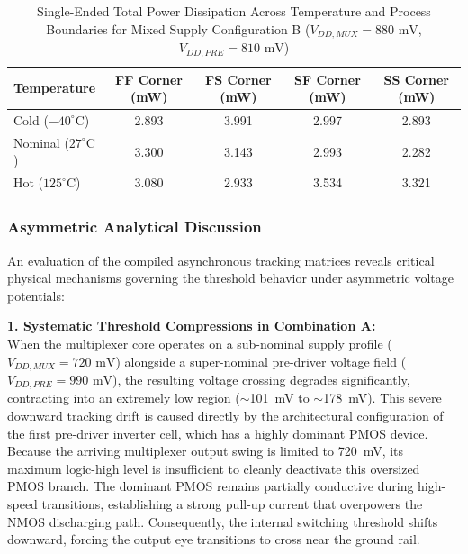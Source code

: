 \begin{table}[H]
    \centering
    \renewcommand{\arraystretch}{1.3}
    \setlength{\tabcolsep}{10pt}
    \small
    \begin{tabular}{|l|c|c|c|c|}
        \hline
        \textbf{Temperature} & \textbf{FF Corner (mW)} & \textbf{FS Corner (mW)} & \textbf{SF Corner (mW)} & \textbf{SS Corner (mW)} \\ \hline
        Cold ($-40^\circ\text{C}$) & 2.893 & 3.991 & 2.997 & 2.893 \\ \hline
        Nominal ($27^\circ\text{C}$) & 3.300 & 3.143 & 2.993 & 2.282 \\ \hline
        Hot ($125^\circ\text{C}$) & 3.080 & 2.933 & 3.534 & 3.321 \\ \hline
    \end{tabular}
    \vspace{2mm}
    \caption{Single-Ended Total Power Dissipation Across Temperature and Process Boundaries for Mixed Supply Configuration B ($V_{DD,MUX} = 880\text{ mV}$, $V_{DD,PRE} = 810\text{ mV}$)}
    \label{tab:asym_b_power_summary}
\end{table}

\clearpage

\subsubsection*{Asymmetric Analytical Discussion}

An evaluation of the compiled asynchronous tracking matrices reveals critical physical mechanisms governing the threshold behavior under asymmetric voltage potentials:

\textbf{1. Systematic Threshold Compressions in Combination A:} \\
When the multiplexer core operates on a sub-nominal supply profile ($V_{DD,MUX} = 720\text{ mV}$) alongside a super-nominal pre-driver voltage field ($V_{DD,PRE} = 990\text{ mV}$), the resulting voltage crossing degrades significantly, contracting into an extremely low region ($\sim$101~mV to $\sim$178~mV). This severe downward tracking drift is caused directly by the architectural configuration of the first pre-driver inverter cell, which has a highly dominant PMOS device. Because the arriving multiplexer output swing is limited to 720~mV, its maximum logic-high level is insufficient to cleanly deactivate this oversized PMOS branch. The dominant PMOS remains partially conductive during high-speed transitions, establishing a strong pull-up current that overpowers the NMOS discharging path. Consequently, the internal switching threshold shifts downward, forcing the output eye transitions to cross near the ground rail.

